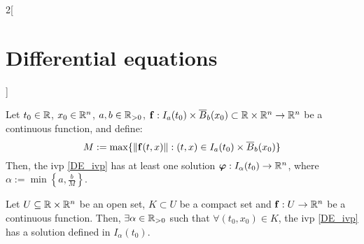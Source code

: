 \documentclass[../../../main.tex]{subfiles}
\begin{document}
\begin{multicols}{2}[\section{Differential equations}]
\begin{theorem}
    Let $t_0\in\mathbb{R}$, $x_0\in\mathbb{R}^n$, $a,b\in\mathbb{R}_{>0}$, $\boldsymbol{\mathrm{f}}:I_a(t_0)\times\overline{B}_{b}(x_0)\subset\mathbb{R}\times\mathbb{R}^n\rightarrow\mathbb{R}^n$ be a continuous function, and define: $$M:=\max\{\|\boldsymbol{\mathrm{f}}(t,x)\|:(t,x)\in I_a(t_0)\times\overline{B}_{b}(x_0)\}$$ Then, the ivp \eqref{DE_ivp} has at least one solution $\boldsymbol{\mathrm{\varphi}}:I_\alpha(t_0)\rightarrow\mathbb{R}^n$, where $\alpha:=\min\left\{a,\frac{b}{M}\right\}$.
  \end{theorem}
  \begin{corollary}
    Let $U\subseteq\mathbb{R}\times\mathbb{R}^n$ be an open set, $K\subset U$ be a compact set and $\boldsymbol{\mathrm{f}}:U\rightarrow\mathbb{R}^n$ be a continuous function. Then, $\exists\alpha\in\mathbb{R}_{>0}$ such that $\forall (t_0,x_0)\in K$, the ivp \eqref{DE_ivp} has a solution defined in $I_\alpha(t_0)$.
  \end{corollary}

\end{multicols}
\end{document}
